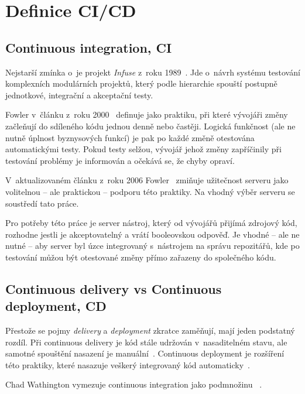     \section*{Definice CI/CD}
        \label{sec:cicd}
        \subsection{Continuous integration, CI}
            Nejstarší zmínka o~\CI je projekt \textit{Infuse} z~roku 1989~\cite{kaiser-infuse}. Jde o~návrh systému testování komplexních modulárních projektů, který podle hierarchie spouští postupně jednotkové, integrační a akceptační testy.

            Fowler v~článku z~roku 2000~\cite{fowler-ci-original} definuje \CI jako praktiku, při které vývojáři změny začleňují do sdíleného kódu jednou denně nebo častěji. Logická funkčnost (ale ne nutně úplnost byznysových funkcí) je pak po každé změně otestována automatickými testy. Pokud testy selžou, vývojář jehož změny zapříčinily při testování problémy je informován a očekává se, že chyby opraví.

            V~aktualizovaném článku z~roku 2006 Fowler~\cite{fowler-ci} zmiňuje užitečnost \CI serveru jako volitelnou -- ale praktickou -- podporu této praktiky. Na vhodný výběr \CI serveru se soustředí tato práce.

            Pro potřeby této práce je \CI server nástroj, který od vývojářů přijímá zdrojový kód, rozhodne jestli je akceptovatelný a vrátí booleovskou odpověď. Je vhodné -- ale ne nutné -- aby \CI server byl úzce integrovaný s~nástrojem na správu repozitářů, kde po testování můžou být otestované změny přímo zařazeny do společného kódu.

        \newpage
        \subsection{Continuous delivery vs Continuous deployment, CD}
            Přestože se pojmy \textit{delivery} a \textit{deployment} zkratce \CD zaměňují, mají jeden podstatný rozdíl. Při continuous delivery je kód stále udržován v~nasaditelném stavu, ale samotné spouštění nasazení je manuální~\cite{cd-delivery}. Continuous deployment je rozšíření této praktiky, které nasazuje veškerý integrovaný kód automaticky~\cite{cd-versus}.

            Chad Wathington vymezuje continuous integration jako podmnožinu \CD~\cite{fowler-go}.

